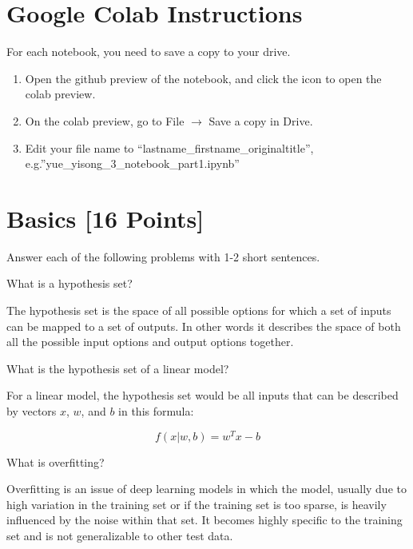 \section*{Google Colab Instructions}

For each notebook, you need to save a copy to your drive.

\begin{enumerate}
	\item Open the github preview of the notebook, and click the icon to open the colab preview.
	\item On the colab preview, go to File $\rightarrow$ Save a copy in Drive.
	\item Edit your file name to “lastname_firstname_originaltitle”, e.g.”yue_yisong_3_notebook_part1.ipynb”
\end{enumerate}


\newpage
\section{Basics [16 Points]}

Answer each of the following problems with 1-2 short sentences.

\begin{problem}[2]
  What is a hypothesis set?
\end{problem}
\begin{solution}
  The hypothesis set is the space of all possible options for which a set of inputs can be mapped to a set of outputs. In other words it describes the space of both all the possible input options and output options together.
\end{solution}

\begin{problem}[2]
  What is the hypothesis set of a linear model?
\end{problem}
\begin{solution}
  For a linear model, the hypothesis set would be all inputs that can be described by vectors $x$, $w$, and $b$ in this formula:
  
  $$f(x|w,b) = w^Tx-b$$
\end{solution}

\begin{problem}[2]
  What is overfitting?
\end{problem}
\begin{solution}
  Overfitting is an issue of deep learning models in which the model, usually due to high variation in the training set or if the training set is too sparse, is heavily influenced by the noise within that set. It becomes highly specific to the training set and is not generalizable to other test data.
\end{solution}

